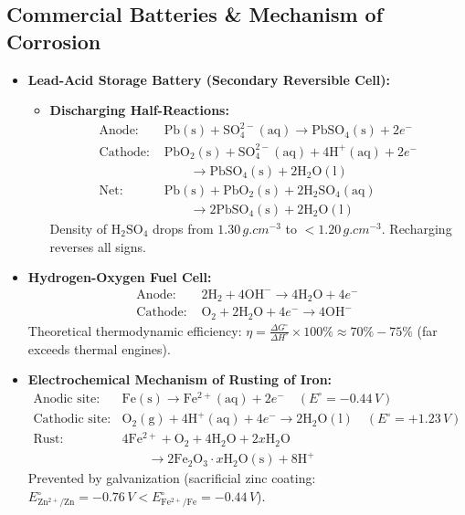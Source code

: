 \documentclass[10pt,twoside,openright]{book}
\begin{document}
\subsection{Commercial Batteries \& Mechanism of Corrosion}
\begin{conceptbox}
\begin{itemize}
  \item \textbf{Lead-Acid Storage Battery (Secondary Reversible Cell):}
  \begin{itemize}
    \item \textbf{Discharging Half-Reactions:}
    \begin{align}
      \text{Anode: } &\mathrm{Pb(s)} + \mathrm{SO_4^{2-}(aq)} \longrightarrow \mathrm{PbSO_4(s)} + 2e^- \\
      \text{Cathode: } &\mathrm{PbO_2(s)} + \mathrm{SO_4^{2-}(aq)} + 4\mathrm{H^+(aq)} + 2e^- \\
                       &\qquad \longrightarrow \mathrm{PbSO_4(s)} + 2\mathrm{H_2O(l)} \\
      \text{Net: } &\mathrm{Pb(s)} + \mathrm{PbO_2(s)} + 2\mathrm{H_2SO_4(aq)} \\
                   &\qquad \longrightarrow 2\mathrm{PbSO_4(s)} + 2\mathrm{H_2O(l)}
    \end{align}
    Density of $\mathrm{H_2SO_4}$ drops from $1.30\,\si{g.cm^{-3}}$ to $< 1.20\,\si{g.cm^{-3}}$. Recharging reverses all signs.
  \end{itemize}
  \item \textbf{Hydrogen-Oxygen Fuel Cell:}
  \begin{align}
    \text{Anode: } &2\mathrm{H_2} + 4\mathrm{OH^-} \longrightarrow 4\mathrm{H_2O} + 4e^- \\
    \text{Cathode: } &\mathrm{O_2} + 2\mathrm{H_2O} + 4e^- \longrightarrow 4\mathrm{OH^-}
  \end{align}
  Theoretical thermodynamic efficiency: $\eta = \frac{\Delta G^\circ}{\Delta H^\circ} \times 100\% \approx 70\%-75\%$ (far exceeds thermal engines).
  \item \textbf{Electrochemical Mechanism of Rusting of Iron:}
  \begin{align}
    \text{Anodic site: } &\mathrm{Fe(s)} \longrightarrow \mathrm{Fe^{2+}(aq)} + 2e^- \quad (E^\circ = -0.44\,\si{V}) \\
    \text{Cathodic site: } &\mathrm{O_2(g)} + 4\mathrm{H^+(aq)} + 4e^- \longrightarrow 2\mathrm{H_2O(l)} \quad (E^\circ = +1.23\,\si{V}) \\
    \text{Rust: } &4\mathrm{Fe^{2+}} + \mathrm{O_2} + 4\mathrm{H_2O} + 2x\mathrm{H_2O} \\
                  &\qquad \longrightarrow 2\mathrm{Fe_2O_3}\cdot x\mathrm{H_2O(s)} + 8\mathrm{H^+}
  \end{align}
  Prevented by galvanization (sacrificial zinc coating: $E^\circ_{\mathrm{Zn^{2+}/Zn}} = -0.76\,\si{V} < E^\circ_{\mathrm{Fe^{2+}/Fe}} = -0.44\,\si{V}$).
\end{itemize}
\end{conceptbox}
\end{document}

